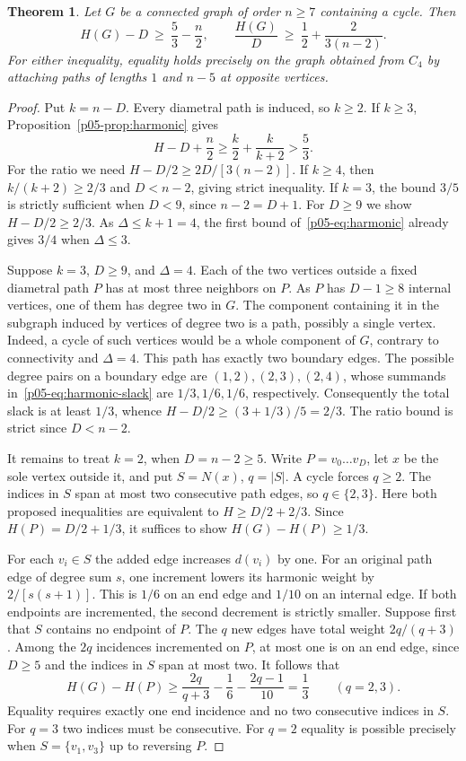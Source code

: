 \documentclass[11pt,a4paper]{article}
\newtheorem{theorem}{Theorem}[section]
\begin{document}
\begin{theorem}\label{p05-thm:jm}
Let $G$ be a connected graph of order $n\ge7$ containing a cycle.
Then
\[
 H(G)-D\ \ge\ \frac53-\frac n2,\qquad
 \frac{H(G)}D\ \ge\ \frac12+\frac{2}{3(n-2)}.
\]
For either inequality, equality holds precisely on the graph obtained
from $C_4$ by attaching paths of lengths $1$ and $n-5$ at opposite
vertices.
\end{theorem}
\begin{proof}
Put $k=n-D$. Every diametral path is induced, so $k\ge2$.
If $k\ge3$, Proposition~\ref{p05-prop:harmonic} gives
\[
 H-D+\frac n2\ge\frac{k}{2}+\frac{k}{k+2}>\frac53.
\]
For the ratio we need $H-D/2\ge 2D/[3(n-2)]$.
If $k\ge4$, then $k/(k+2)\ge2/3$ and $D<n-2$, giving strict
inequality. If $k=3$, the bound $3/5$ is strictly sufficient
when $D<9$, since $n-2=D+1$. For $D\ge9$ we show $H-D/2\ge2/3$.
As $\Delta\le k+1=4$, the first bound of~\eqref{p05-eq:harmonic}
already gives $3/4$ when $\Delta\le3$.

Suppose $k=3$, $D\ge9$, and $\Delta=4$. Each of the two vertices
outside a fixed diametral path $P$ has at most three neighbors on $P$.
As $P$ has $D-1\ge8$ internal vertices, one of them has degree two in $G$.
The component containing it in the subgraph induced by vertices of
degree two is a path, possibly a single vertex. Indeed, a cycle of such
vertices would be a whole component of $G$, contrary to connectivity and
$\Delta=4$. This path has exactly two boundary edges. The possible
degree pairs on a boundary edge are $(1,2),(2,3),(2,4)$, whose
summands in~\eqref{p05-eq:harmonic-slack} are $1/3,1/6,1/6$, respectively.
Consequently the total slack is at least $1/3$, whence
$H-D/2\ge (3+1/3)/5=2/3$. The ratio bound is strict since $D<n-2$.

It remains to treat $k=2$, when $D=n-2\ge5$. Write
$P=v_0\ldots v_D$, let $x$ be the sole vertex outside it, and put
$S=N(x)$, $q=|S|$. A cycle forces $q\ge2$. The indices in $S$
span at most two consecutive path edges, so $q\in\{2,3\}$.
Here both proposed inequalities are equivalent to $H\ge D/2+2/3$.
Since $H(P)=D/2+1/3$, it suffices to show $H(G)-H(P)\ge1/3$.

For each $v_i\in S$ the added edge increases $d(v_i)$ by one.
For an original path edge of degree sum $s$, one increment lowers
its harmonic weight by $2/[s(s+1)]$. This is $1/6$ on an end edge
and $1/10$ on an internal edge. If both endpoints are incremented,
the second decrement is strictly smaller.
Suppose first that $S$ contains no endpoint of $P$. The $q$ new edges
have total weight $2q/(q+3)$. Among the $2q$ incidences incremented
on $P$, at most one is on an end edge, since $D\ge5$ and the indices
in $S$ span at most two. It follows that
\[
 H(G)-H(P)\ge\frac{2q}{q+3}-\frac16-\frac{2q-1}{10}
 =\frac13 \qquad(q=2,3).
\]
Equality requires exactly one end incidence and no two consecutive
indices in $S$. For $q=3$ two indices must be consecutive. For
$q=2$ equality is possible precisely when $S=\{v_1,v_3\}$ up
to reversing $P$.


\end{proof}
\end{document}
